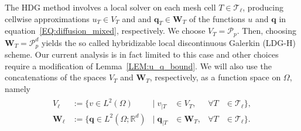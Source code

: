 \documentclass[a4paper, english, 12pt, reqno, draft]{amsart}
\theoremstyle{definition}
\theoremstyle{remark}
\numberwithin{equation}{section}
\newcommand{\elem}{\ensuremath{T}}
\newcommand{\mesh}{\ensuremath{\mathcal T}}
\newcommand{\discElementSpace}{\ensuremath{V}}
\newcommand{\polynomials}{\ensuremath{\mathcal P}}
\newcommand{\level}{\ensuremath{\ell}}
\renewcommand{\vec}[1]{\ensuremath{\boldsymbol{#1}}}
\begin{document}
The HDG method involves a local solver on each mesh cell
$\elem \in \mesh_\level$, producing cellwise approximations $u_\elem \in V_\elem$
and and $\vec q_\elem\in \vec W_\elem$ of the functions $u$ and $\vec q$ in
equation~\eqref{EQ:diffusion_mixed}, respectively. We choose
$V_\elem = \polynomials_p$. Then, choosing
$\vec W_\elem = \polynomials_p^d$ yields the so called hybridizable local discontinuous Galerkin (LDG-H) scheme. Our current analysis is in fact limited to this case and other choices require a modification of Lemma~\ref{LEM:u_q_bound}. We will also use the concatenations of the spaces $V_\elem$
and $\vec W_\elem$, respectively, as a function space on $\Omega$, namely
\begin{gather}
  \label{EQ:dg_spaces}
  \begin{aligned}
    \discElementSpace_\level
    &:=\bigl\{ v \in L^2(\Omega)
    & \big|\;v_{|\elem} &\in V_\elem,
    &\forall \elem &\in \mesh_\level \bigr\},\\
    \vec W_\level
    &:=\bigl\{ \vec q \in L^2(\Omega;\mathbb R^d)
    & \big|\;\vec q_{|\elem} &\in \vec W_\elem,
    &\forall \elem &\in \mesh_\level \bigr\}.    
  \end{aligned}
\end{gather}



% 


% 
\end{document}
